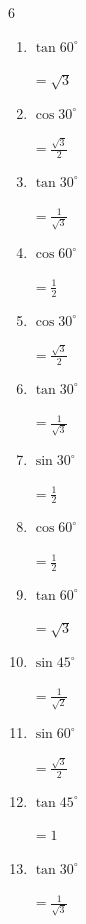 \begin{multicols}{6}
\begin{enumerate}
  \item $\displaystyle \tan{60^\circ}$

        $\displaystyle =\sqrt{3}$

  \item $\displaystyle \cos{30^\circ}$

        $\displaystyle =\frac{\sqrt{3}}{2}$

  \item $\displaystyle \tan{30^\circ}$

        $\displaystyle =\frac{1}{\sqrt{3}}$

  \item $\displaystyle \cos{60^\circ}$

        $\displaystyle =\frac{1}{2}$

  \item $\displaystyle \cos{30^\circ}$

        $\displaystyle =\frac{\sqrt{3}}{2}$

  \item $\displaystyle \tan{30^\circ}$

        $\displaystyle =\frac{1}{\sqrt{3}}$

\columnbreak %

  \item $\displaystyle \sin{30^\circ}$

        $\displaystyle =\frac{1}{2}$

  \item $\displaystyle \cos{60^\circ}$

        $\displaystyle =\frac{1}{2}$

  \item $\displaystyle \tan{60^\circ}$

        $\displaystyle =\sqrt{3}$

  \item $\displaystyle \sin{45^\circ}$

        $\displaystyle =\frac{1}{\sqrt{2}}$

  \item $\displaystyle \sin{60^\circ}$

        $\displaystyle =\frac{\sqrt{3}}{2}$

  \item $\displaystyle \tan{45^\circ}$

        $\displaystyle =1$

  \item $\displaystyle \tan{30^\circ}$

        $\displaystyle =\frac{1}{\sqrt{3}}$


\end{enumerate}
\end{multicols}
